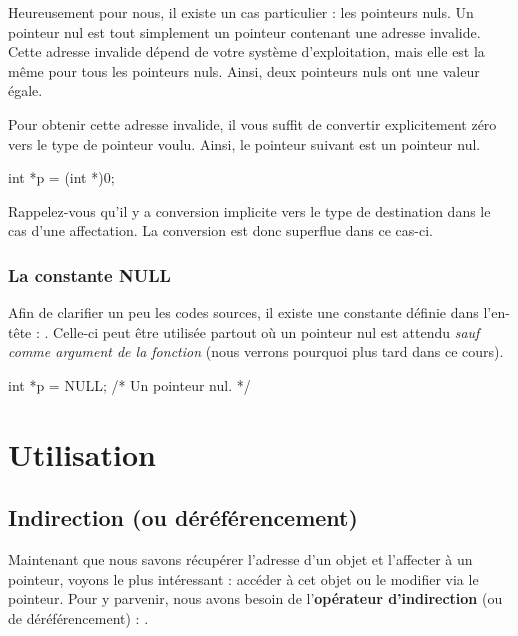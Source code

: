 Heureusement pour nous, il existe un cas particulier : les pointeurs
nuls. Un pointeur nul est tout simplement un pointeur contenant une
adresse invalide. Cette adresse invalide dépend de votre système
d'exploitation, mais elle est la même pour tous les pointeurs nuls.
Ainsi, deux pointeurs nuls ont une valeur égale.

Pour obtenir cette adresse invalide, il vous suffit de convertir
explicitement zéro vers le type de pointeur voulu. Ainsi, le pointeur
suivant est un pointeur nul.

\begin{C}
int *p = (int *)0;
\end{C}

\begin{infobox}
Rappelez-vous qu'il y a conversion implicite vers le type de destination
dans le cas d'une affectation. La conversion est donc superflue dans ce cas-ci. 
\end{infobox}


\subsubsection{La constante NULL}
\label{la-constante-null}

Afin de clarifier un peu les codes sources, il existe une constante
définie dans l'en-tête  :
. Celle-ci peut être utilisée partout où un pointeur nul
est attendu \emph{sauf comme argument de la fonction }
(nous verrons pourquoi plus tard dans ce cours).

\begin{C}
int *p = NULL; /* Un pointeur nul. */
\end{C}

\section{Utilisation }
\label{utilisation-2}

\subsection{Indirection (ou déréférencement)}
\label{indirection-(ou déréférencement)}

Maintenant que nous savons récupérer l'adresse d'un objet et l'affecter
à un pointeur, voyons le plus intéressant : accéder à cet objet ou le
modifier via le pointeur. Pour y parvenir, nous avons besoin de
l'\textbf{opérateur d'indirection} (ou de déréférencement) : \mybox{*}.

